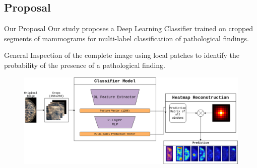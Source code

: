 \subsection{Proposal}
\begin{frame}{Our Proposal}
    Our study proposes a Deep Learning Classifier trained on cropped segments of mammograms for multi-label classification of pathological findings.

    General Inspection of the complete image using local patches to identify the probability of the presence of a pathological finding.

    \begin{figure}
        \centering
        \includegraphics[height=0.5\textheight]{imagenes/modelo.png}
    \end{figure}
\end{frame}

